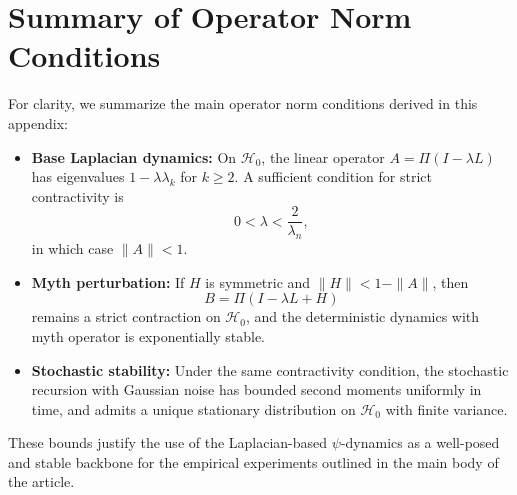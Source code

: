 \documentclass[11pt]{article}
\begin{document}
\section{Summary of Operator Norm Conditions}

For clarity, we summarize the main operator norm conditions derived
in this appendix:

\begin{itemize}
  \item \textbf{Base Laplacian dynamics:} On \(\mathcal{H}_0\), the
        linear operator \(A = \Pi(I - \lambda L)\) has eigenvalues
        \(1 - \lambda\lambda_k\) for \(k\ge 2\). A sufficient condition
        for strict contractivity is
        \[
        0 < \lambda < \frac{2}{\lambda_n},
        \]
        in which case \(\|A\|<1\).
  \item \textbf{Myth perturbation:} If \(H\) is symmetric and
        \(\|H\| < 1 - \|A\|\), then
        \[
        B = \Pi(I - \lambda L + H)
        \]
        remains a strict contraction on \(\mathcal{H}_0\), and the
        deterministic dynamics with myth operator is exponentially stable.
  \item \textbf{Stochastic stability:} Under the same contractivity
        condition, the stochastic recursion with Gaussian noise has
        bounded second moments uniformly in time, and admits a unique
        stationary distribution on \(\mathcal{H}_0\) with finite variance.
\end{itemize}

These bounds justify the use of the Laplacian-based \(\psi\)-dynamics
as a well-posed and stable backbone for the empirical experiments
outlined in the main body of the article.

\nocite{*}


\end{document}
